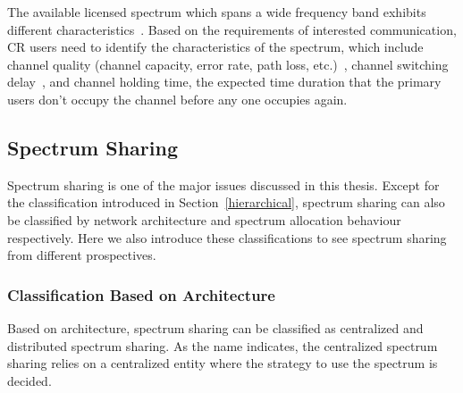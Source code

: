 The available licensed spectrum which spans a wide frequency band exhibits different characteristics~\cite{spectrum_decision_TMC11}.
Based on the requirements of interested communication, CR users need to identify the characteristics of the spectrum, which include channel quality (channel capacity, error rate, path loss, etc.)~\cite{spectrum_decision_TMC11}, channel switching delay~\cite{channel_switch_delay11}, and channel holding time, \ie the expected time duration that the primary users don't occupy the channel before any one occupies again.

\subsection{Spectrum Sharing}
Spectrum sharing is one of the major issues discussed in this thesis.
Except for the classification introduced in Section~\ref{hierarchical}, spectrum sharing can also be classified by network architecture and spectrum allocation behaviour~\cite{Akyildiz09} respectively.
Here we also introduce these classifications to see spectrum sharing from different prospectives.
\subsubsection*{Classification Based on Architecture}
Based on architecture, spectrum sharing can be classified as centralized and distributed spectrum sharing.
As the name indicates, the centralized spectrum sharing relies on a centralized entity where the strategy to use the spectrum is decided. 

